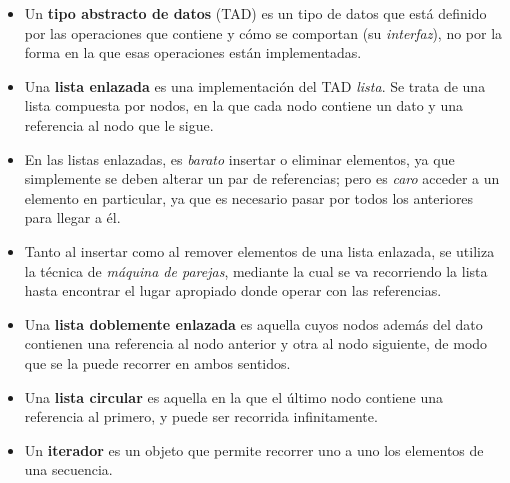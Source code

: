 \begin{itemize}

\item Un {\bf tipo abstracto de datos} (TAD) es un tipo de datos que está
definido por las operaciones que contiene y cómo se comportan (su
\emph{interfaz}), no por la forma en la que esas operaciones están implementadas.

\item Una {\bf lista enlazada} es una implementación del TAD \emph{lista}.
Se trata de una lista compuesta por nodos, en la que
cada nodo contiene un dato y una referencia al nodo que le sigue.

\item En las listas enlazadas, es \emph{barato} insertar o eliminar
elementos, ya que simplemente se deben alterar un par de referencias; pero
es \emph{caro} acceder a un elemento en particular, ya que es necesario
pasar por todos los anteriores para llegar a él.

\item Tanto al insertar como al remover elementos de una lista enlazada, se
utiliza la técnica de \emph{máquina de parejas}, mediante la cual se va
recorriendo la lista hasta encontrar el lugar apropiado donde operar con
las referencias.

\item Una {\bf lista doblemente enlazada} es aquella cuyos nodos además del
dato contienen una referencia al nodo anterior y otra al nodo siguiente, de
modo que se la puede recorrer en ambos sentidos.

\item Una {\bf lista circular} es aquella en la que el último nodo contiene
una referencia al primero, y puede ser recorrida infinitamente.

\item Un {\bf iterador} es un objeto que permite recorrer uno a uno los
elementos de una secuencia.

\end{itemize}

